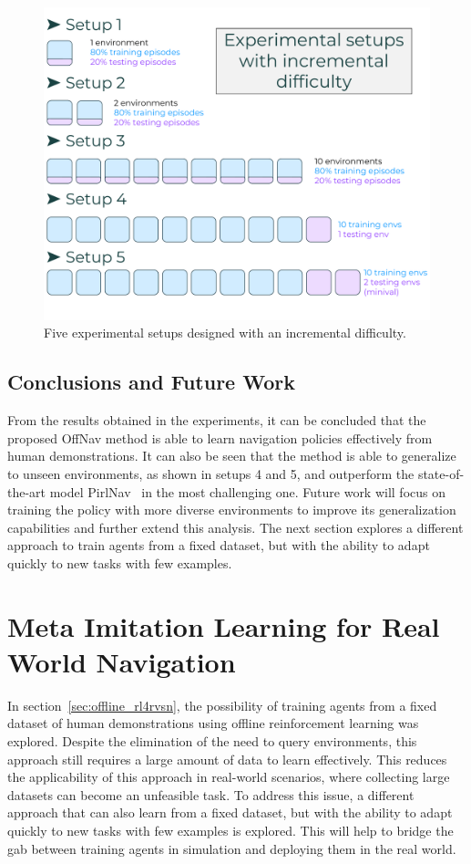 \begin{figure}
    \centering
    \includegraphics[width=0.8\linewidth]{figures/offnav/experimental_setups}
    \caption{Five experimental setups designed with an incremental difficulty.}
    \label{fig:setups}
\end{figure}

\subsection{Conclusions and Future Work}\label{subsec:conclusions_offnav}

From the results obtained in the experiments, it can be concluded that the proposed OffNav method is able to learn navigation policies effectively from human demonstrations.
It can also be seen that the method is able to generalize to unseen environments, as shown in setups 4 and 5, and outperform the state-of-the-art model PirlNav~\cite{ramrakhya2023} in the most challenging one.
Future work will focus on training the policy with more diverse environments to improve its generalization capabilities and further extend this analysis.
The next section explores a different approach to train agents from a fixed dataset, but with the ability to adapt quickly to new tasks with few examples.


\section{Meta Imitation Learning for Real World Navigation}\label{sec:mil-for-real-world-navigation}

In section~\ref{sec:offline_rl4rvsn}, the possibility of training agents from a fixed dataset of human demonstrations using offline reinforcement learning was explored.
Despite the elimination of the need to query environments, this approach still requires a large amount of data to learn effectively.
This reduces the applicability of this approach in real-world scenarios, where collecting large datasets can become an unfeasible task.
To address this issue, a different approach that can also learn from a fixed dataset, but with the ability to adapt quickly to new tasks with few examples is explored.
This will help to bridge the gab between training agents in simulation and deploying them in the real world.

